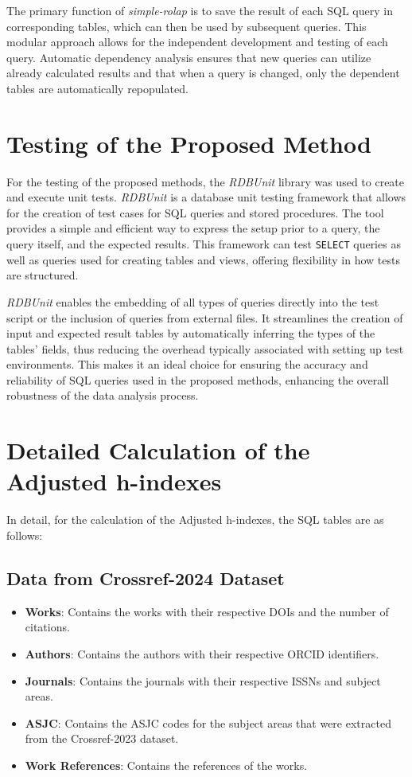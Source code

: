 The primary function of \emph{simple-rolap} is to save the result of each SQL
query in corresponding tables, which can then be used by subsequent queries.
This modular approach allows for the independent development and testing of
each query. Automatic dependency analysis ensures that new queries can utilize
already calculated results and that when a query is changed, only the dependent
tables are automatically repopulated.

\section{Testing of the Proposed Method}
For the testing of the proposed methods, the \emph{RDBUnit} \cite{rdbunit}
library was used to create and execute unit tests. \emph{RDBUnit} is a database
unit testing framework that allows for the creation of test cases for SQL
queries and stored procedures. The tool provides a simple and efficient way to
express the setup prior to a query, the query itself, and the expected results.
This framework can test \texttt{SELECT} queries as well as queries used for
creating tables and views, offering flexibility in how tests are structured.

\emph{RDBUnit} enables the embedding of all types of queries directly into the test
script or the inclusion of queries from external files. It streamlines the
creation of input and expected result tables by automatically inferring the
types of the tables' fields, thus reducing the overhead typically associated
with setting up test environments. This makes it an ideal choice for
ensuring the accuracy and reliability of SQL queries used in the proposed
methods, enhancing the overall robustness of the data analysis process.

\section{Detailed Calculation of the Adjusted h-indexes}

In detail, for the calculation of the Adjusted h-indexes, the SQL tables are as
follows:

\subsection{Data from Crossref-2024 Dataset}
\begin{itemize}
      \item \textbf{Works}: Contains the works with their respective DOIs and the number of citations.
      \item \textbf{Authors}: Contains the authors with their respective ORCID identifiers.
      \item \textbf{Journals}: Contains the journals with their respective ISSNs and subject areas.
      \item \textbf{ASJC}: Contains the ASJC codes for the subject areas that were extracted from the Crossref-2023 dataset.
      \item \textbf{Work References}: Contains the references of the works.
\end{itemize}

